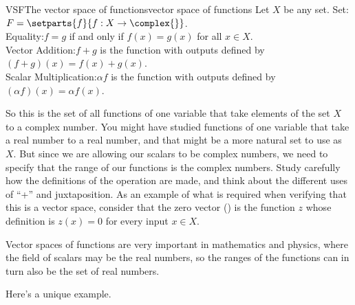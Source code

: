 \begin{example}{VSF}{The vector space of functions}{vector space of functions}
Let $X$ be any set.
Set:\quad $F=\setparts{f}{f:X\rightarrow\complex{\null}}$.\\
Equality:\quad $f=g$ if and only if $f(x)=g(x)$ for all $x\in X$.\\
Vector Addition:\quad  $f+g$ is the function with outputs defined by $(f+g)(x)=f(x)+g(x)$.\\
Scalar Multiplication:\quad $\alpha f$ is the function with outputs defined by $(\alpha f)(x)=\alpha f(x)$.\par\medskip
%
So this is the set of all functions of one variable that take elements of the set $X$ to a complex number.  You might have studied functions of one variable that take a real number to a real number, and that might be a more natural set to use as $X$.  But since we are allowing our scalars to be complex numbers, we need to specify that the range of our functions is the complex numbers.  Study carefully how the definitions of the operation are made, and think about the different uses of ``+'' and juxtaposition.  As an example of what is required when verifying that this is a vector space, consider that  the zero vector () is the function $z$ whose definition is $z(x)=0$ for every input $x\in X$.\par
%
Vector spaces of functions are very important in mathematics and physics, where the field of scalars may be the real numbers, so the ranges of the functions can in turn also be the set of real numbers.\par
%
\end{example}
%
Here's a unique example.
%
